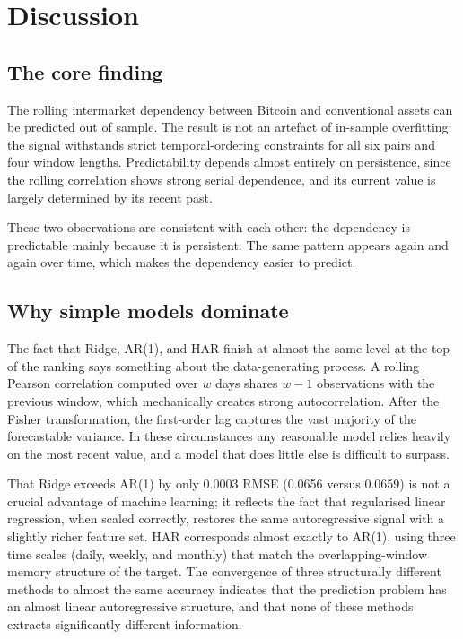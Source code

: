 \section{Discussion}
\label{sec:discussion}

\subsection{The core finding}

The rolling intermarket dependency between Bitcoin and conventional assets can be predicted out of sample. The result is not an artefact of in-sample overfitting: the signal withstands strict temporal-ordering constraints for all six pairs and four window lengths. Predictability depends almost entirely on persistence, since the rolling correlation shows strong serial dependence, and its current value is largely determined by its recent past.

These two observations are consistent with each other: the dependency is predictable mainly because it is persistent. The same pattern appears again and again over time, which makes the dependency easier to predict.

\subsection{Why simple models dominate}

The fact that Ridge, AR(1), and HAR finish at almost the same level at the top of the ranking says something about the data-generating process. A rolling Pearson correlation computed over $w$ days shares $w-1$ observations with the previous window, which mechanically creates strong autocorrelation. After the Fisher transformation, the first-order lag captures the vast majority of the forecastable variance. In these circumstances any reasonable model relies heavily on the most recent value, and a model that does little else is difficult to surpass.

That Ridge exceeds AR(1) by only 0.0003 RMSE (0.0656 versus 0.0659) is not a crucial advantage of machine learning; it reflects the fact that regularised linear regression, when scaled correctly, restores the same autoregressive signal with a slightly richer feature set. HAR corresponds almost exactly to AR(1), using three time scales (daily, weekly, and monthly) that match the overlapping-window memory structure of the target. The convergence of three structurally different methods to almost the same accuracy indicates that the prediction problem has an almost linear autoregressive structure, and that none of these methods extracts significantly different information.

